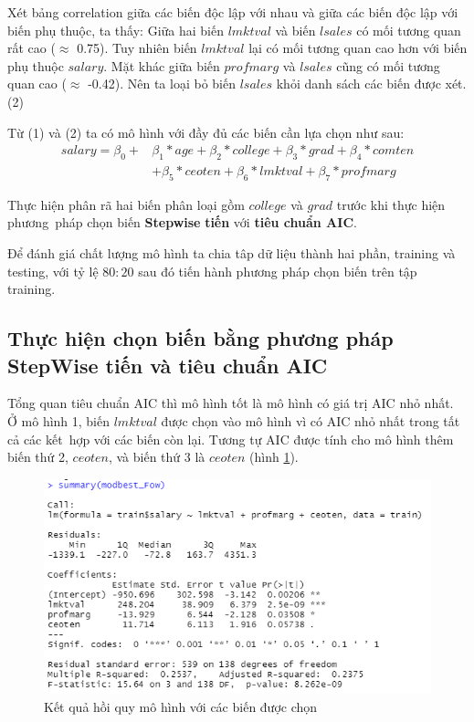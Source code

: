 Xét bảng correlation giữa các biến độc lập với nhau và giữa các biến độc lập với biến phụ thuộc, ta thấy: Giữa hai biến $\textit{lmktval}$ và biến $\textit{lsales}$ có mối tương quan rất cao ($\approx$ 0.75). Tuy nhiên biến $\textit{lmktval}$ lại có mối tương quan cao hơn với biến phụ thuộc $\textit{salary}$. Mặt khác giữa biến $\textit{profmarg}$ và $\textit{lsales}$ cũng có mối tương quan cao ($\approx$ -0.42). Nên ta loại bỏ biến $\textit{lsales}$ khỏi danh sách các biến được xét. (2)

Từ (1) và (2) ta có mô hình với đầy đủ các biến cần lựa chọn như sau:
\begin{equation}\label{eq-b1:full-model}
	\begin{split}
		salary 	= \beta_0 + &\beta_1*age + \beta_2*college + \beta_3*grad + \beta_4*comten\\
		&+ \beta_5*ceoten + \beta_6*lmktval + \beta_7*profmarg
	\end{split}
\end{equation}


Thực hiện phân rã hai biến phân loại gồm $college$ và $grad$ trước khi thực hiện phương~pháp chọn biến \textbf{Stepwise} \textbf{tiến} với \textbf{tiêu chuẩn AIC}.

Để đánh giá chất lượng mô hình ta chia tâp dữ liệu thành hai phần, training và testing, với tỷ lệ $80:20$ sau đó tiến hành phương pháp chọn biến trên tập training.

\subsection*{Thực hiện chọn biến bằng phương pháp StepWise tiến và tiêu chuẩn AIC}


Tổng quan tiêu chuẩn AIC thì mô hình tốt là mô hình có giá trị AIC nhỏ nhất. Ở mô hình 1, biến $\textit{lmktval}$ được chọn vào mô hình vì có AIC nhỏ nhất trong tất cả các kết~hợp với các biến còn lại. Tương tự AIC được tính cho mô hình thêm biến thứ 2, $\textit{ceoten}$, và biến thứ 3 là $\textit{ceoten}$ (hình \ref{ex1:model:1}).

\begin{figure}[H]
	\centering
	\includegraphics[width=.7\linewidth]{../Photo Of Result/B1_summary.PNG}  
	\caption{Kết quả hồi quy mô hình với các biến được chọn}
	\label{ex1:model:1}
\end{figure}

